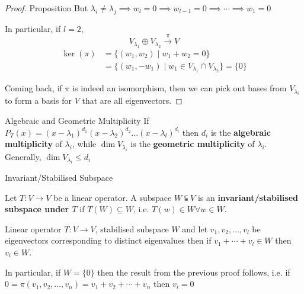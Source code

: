 \begin{proof} {Proposition}
    But \(\lambda_i \neq \lambda_j \implies w_l = 0 \implies w_{l-1} = 0 \implies \cdots \implies w_1 = 0\)

    In particular, if \(l = 2\), \[
        V_{\lambda_1} \oplus V_{\lambda_2} \xrightarrow{\pi} V
    \]
    \begin{align*}
        \ker(\pi) & = \{(w_1, w_2) \mid w_1 + w_2 = 0\}                                      \\
                  & = \{(w_1, -w_1) \mid  w_1 \in V_{\lambda_1} \cap V_{\lambda_2}\} = \{0\}
    \end{align*}

    Coming back, if \(\pi\) is indeed an isomorphism, then we can pick out bases from \(V_{\lambda_i}\) to form a basis for \(V\) that are all eigenvectors.
\end{proof}

\begin{definition} {Algebraic and Geometric Multiplicity}
    If \(P_T(x) = (x-\lambda_1)^{d_1}(x-\lambda_2)^{d_2}\dots (x-\lambda_l)^{d_l}\) then \(d_i\) is the \textbf{algebraic multiplicity} of \(\lambda_i\), while \(\dim V_{\lambda_i}\)   is the \textbf{geometric multiplicity} of \(\lambda_i\). Generally, \(\dim V_{\lambda_i} \leq d_i\)
\end{definition}

\begin{definition} {Invariant/Stabilised Subspace}

    Let \(T: V \to V\) be a linear operator. A subspace \(W \subseteqq V\) is an \textbf{invariant/stabilised subspace under \(T\)} if \(T(W) \subseteq W \), i.e. \(T(w) \in W \forall w \in W\).
\end{definition}
\begin{lemma}
    Linear operator \(T: V \to V\), stabilised subspace \(W\) and let \(v_1, v_2, \dots, v_l\) be eigenvectors corresponding to distinct eigenvalues then if \(v_1 + \cdots + v_l \in W\) then \(v_i \in W\).
\end{lemma}

\begin{remark}
    In particular, if \(W = \{0\}\) then the result from the previous proof follows, i.e. if \(0 = \pi(v_1, v_2, \dots, v_n) = v_1 + v_2 + \cdots + v_n\) then \(v_i = 0\)
\end{remark}

